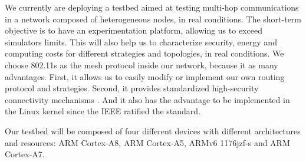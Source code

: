 \documentclass[10pt,twocolumn,letterpaper]{article}
\begin{document}
We currently are deploying a testbed aimed at testing multi-hop communications in a network composed of heterogeneous nodes, in real conditions. The short-term objective is to have an experimentation platform, allowing us to exceed simulators limits. This will also help us to characterize security, energy and computing costs for different strategies and topologies, in real conditions. We choose 802.11s as the mesh protocol inside our network, because it as many advantages. First, it allows us to easily modify or implement our own routing protocol and strategies. Second, it provides standardized high-security connectivity mechanisms \cite{Hiertz2010}. And it also has the advantage to be implemented in the Linux kernel since the IEEE ratified the standard.

Our testbed will be composed of four different devices with different architectures and resources: ARM Cortex-A8, ARM Cortex-A5, ARMv6 1176jzf-s and ARM Cortex-A7.

{\small


}
\end{document}
